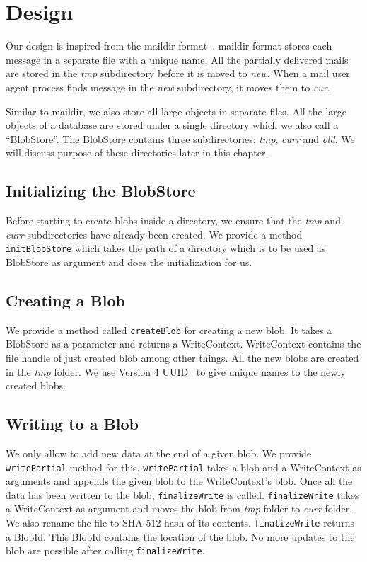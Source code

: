 \chapter{Design}
\label{chap:design}

Our design is inspired from the maildir format~\cite{bernstein1995using}. maildir format stores each message in a separate file with a unique name. All the partially delivered mails are stored in the \textit{tmp} subdirectory before it is moved to \textit{new}. When a mail user agent process finds message in the \textit{new} subdirectory, it moves them to \textit{cur}.

Similar to maildir, we also store all large objects in separate files. All the large objects of a database are stored under a single directory which we also call a ``BlobStore''.
The BlobStore contains three subdirectories: \textit{tmp}, \textit{curr} and \textit{old}. We will discuss purpose of these directories later in this chapter.

\section{Initializing the BlobStore}
Before starting to create blobs inside a directory, we ensure that the \textit{tmp} and \textit{curr} subdirectories have already been created. We provide a method \texttt{initBlobStore} which takes the path of a directory which is to be used as BlobStore as argument and does the initialization for us.

\section{Creating a Blob}
We provide a method called \texttt{createBlob} for creating a new blob. It takes a BlobStore as a parameter and returns a WriteContext. WriteContext contains the file handle of just created blob among other things. All the new blobs are created in the \textit{tmp} folder. We use Version 4 UUID~\cite{leach2005universally} to give unique names to the newly created blobs.

\section{Writing to a Blob}
We only allow to add new data at the end of a given blob. We provide \texttt{writePartial} method for this. \texttt{writePartial} takes a blob and a WriteContext as arguments and appends the given blob to the WriteContext's blob.
Once all the data has been written to the blob, \texttt{finalizeWrite} is called. \texttt{finalizeWrite} takes a WriteContext as argument and moves the blob from \textit{tmp} folder to \textit{curr} folder. We also rename the file to SHA-512 hash of its contents.
\texttt{finalizeWrite} returns a BlobId. This BlobId contains the location of the blob. No more updates to the blob are possible after calling \texttt{finalizeWrite}.

